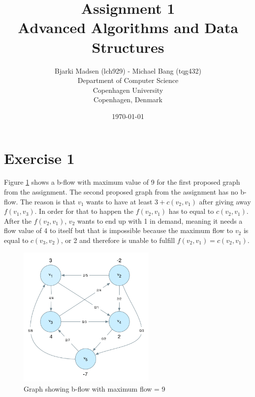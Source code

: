 \documentclass[12pt]{article}
\newcommand{\assignmentname}{Assignment 1}
\newcommand{\coursename}{Advanced Algorithms and Data Structures}
\newcommand{\studentname}{Bjarki Madsen (lch929) - Michael Bang (tqg432)}
\newcommand{\department}{Department of Computer Science}
\newcommand{\institution}{Copenhagen University}
\newcommand{\location}{Copenhagen, Denmark}
\begin{document}
\renewcommand\refname{References}

\title{\assignmentname \\ {\Large {\textsc \coursename}}}
\author{
        \studentname \\
        \department \\
        \institution \\
        \location
}
\date{\today}

\maketitle
\thispagestyle{empty}

\pagebreak

\section*{Exercise 1}

  Figure \ref{fig:e1_a_solution} shows a b-flow with maximum value of 9 for the first proposed graph from the assignment. The second proposed graph from the assignment has no b-flow. The reason is that $v_1$ wants to have at least $3 + c(v_2, v_1)$ after giving away $f(v_1, v_3)$. In order for that to happen the $f(v_2, v_1)$ has to equal to $c(v_2, v_1)$. After the $f(v_2, v_1)$, $v_2$ wants to end up with 1 in demand, meaning it needs a flow value of 4 to itself but that is impossible because the maximum flow to $v_2$ is equal to $c(v_3, v_2)$, or 2 and therefore is unable to fulfill $f(v_2, v_1) = c(v_2, v_1)$. 

  \begin{figure}[h]
    \centering
      \includegraphics[width=0.6\textwidth]{figures/e1_a_solution}
    \caption{Graph showing b-flow with maximum flow = 9}
    \label{fig:e1_a_solution}
  \end{figure}
\end{document}
